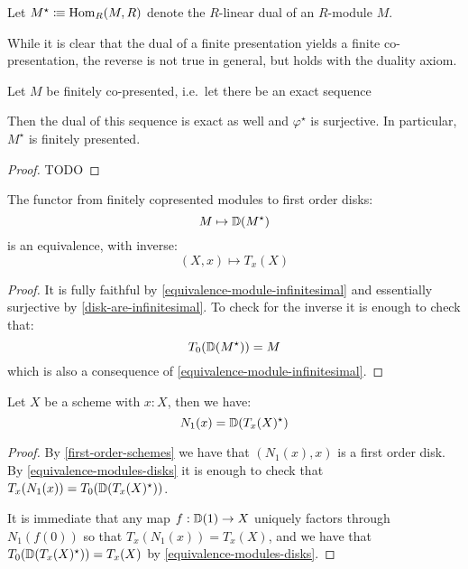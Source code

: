 \begin{definition}
  Let $M^\star\vcentcolon\mspace{-1.2mu}\equiv \mathrm{Hom}_{R}(M,R)$ denote the $R$-linear dual of an $R$-module $M$.
\end{definition}
While it is clear that the dual of a finite presentation yields a finite co-presentation, the reverse is not true in general, but holds with the duality axiom.

\begin{lemma}
  Let $M$ be finitely co-presented, i.e.\ let there be an exact sequence
  \begin{center}
  \end{center}
  Then the dual of this sequence is exact as well and $\varphi^\star$ is surjective.
  In particular, $M^\star$ is finitely presented.
\end{lemma}

\begin{proof}
  TODO
\end{proof}

\begin{lemma}\label{equivalence-modules-disks}
  The functor from finitely copresented modules to first order disks:
  \[M\mapsto \mathbb{D}(M^\star)\]
  is an equivalence, with inverse:
  \[(X,x)\mapsto T_x(X)\]
\end{lemma}

\begin{proof}
It is fully faithful by \cref{equivalence-module-infinitesimal} and essentially surjective by \cref{disk-are-infinitesimal}. To check for the inverse it is enough to check that:
\[T_0(\mathbb{D}(M^\star)) = M\]
which is also a consequence of \cref{equivalence-module-infinitesimal}.
\end{proof}

\begin{lemma}\label{duality-infinitesimal-tangent}
Let $X$ be a scheme with $x:X$, then we have:
\[N_1(x) = \mathbb{D}(T_x(X)^\star)\]
\end{lemma}

\begin{proof}
By \cref{first-order-schemes} we have that $(N_1(x),x)$ is a first order disk. By \cref{equivalence-modules-disks} it is enough to check that $T_x(N_1(x)) = T_0(\mathbb{D}(T_x(X)^\star))$. 

It is immediate that any map $f:\mathbb{D}(1)\to X$ uniquely factors through $N_1(f(0))$ so that $T_x(N_1(x)) = T_x(X)$, and we have that $T_0(\mathbb{D}(T_x(X)^\star)) = T_x(X)$ by \cref{equivalence-modules-disks}.
\end{proof}


